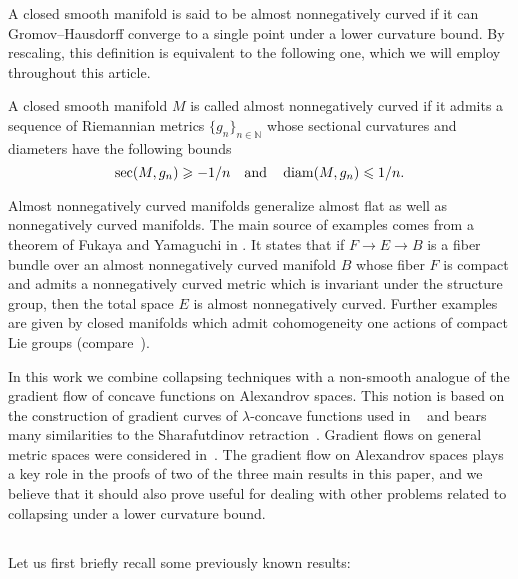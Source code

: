 \documentclass{amsart}
\begin{document}
A closed smooth manifold is  said
to be almost nonnegatively curved
if
it can Gromov--Hausdorff converge to a single point
under a lower curvature bound.
By rescaling, this definition is equivalent to the following one,
which we will employ throughout this article.

\begin{defn}
A closed smooth manifold $M$ is called almost nonnegatively curved
if it admits a sequence of Riemannian metrics $\{g_n\}_{n\in\mathbb{N}}$
whose sectional curvatures and diameters have the following bounds
$$\sec(M,g_n)\geqslant -1/n\quad\text{and}\quad\operatorname{\rm diam}(M,g_n)\leqslant 1/n.$$
\end{defn}

Almost nonnegatively curved manifolds
generalize almost flat as well as nonnegatively
curved manifolds.
The main source of examples
comes from a theorem of Fukaya and Yamaguchi in \cite{FY}.
It states that
if $F\to E\to B$ is a fiber bundle
over an almost nonnegatively curved manifold $B$
whose fiber $F$ is compact
and admits a nonnegatively curved metric 
which is invariant under the
structure group, 
then the total space $E$ is almost nonnegatively curved.
Further examples are given by closed manifolds which admit
cohomogeneity one actions of
compact Lie groups %
(compare~\cite{ST}).


In this work we combine collapsing techniques with a non-smooth analogue of the gradient flow of concave functions on Alexandrov spaces.
This notion is based  on the construction  of gradient curves of $\lambda$-concave functions used in ~\cite{PP} and bears many similarities to the Sharafutdinov retraction~\cite{Shar}.
Gradient flows on general metric spaces were considered in~\cite{grad-flow-book}.
The gradient flow on Alexandrov spaces plays a key role in the proofs of two of the three main results in this paper, and we believe that it should also prove useful for dealing with other problems related to collapsing under a lower curvature bound.

\subsection{} Let us first briefly recall some  previously known results:
\end{document}
